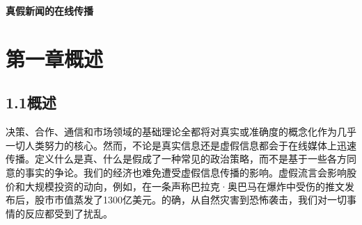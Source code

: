 \documentclass[a4paper,AutoFakeBold,oneside,12pt]{book}
\begin{document}
\begin{nopagenumber}
\begin{center}
\begin{tabular}{ccc}
	\end{tabular}
\end{center}


\newpage\backmatter
\thispagestyle{empty}



\setcounter{chapter}{0}
\renewcommand{\thefigure}{~外\arabic{chapter}-\arabic{figure}~}
\renewcommand{\theequation}{~外\arabic{chapter}-\arabic{equation}~}
\renewcommand{\thetable}{~外\arabic{chapter}-\arabic{table}~}
\renewcommand{\thelstlisting}{~外\arabic{chapter}-\arabic{lstlisting}~}

\begin{center}
\end{center}
\vspace{8mm}
\thispagestyle{empty}


\begin{center}
\sanhao\heiti\textbf{真假新闻的在线传播}

\xiaosihao{}

\xiaosihao{}
\end{center}

\songti{}
\begingroup %
\let\clearpage\relax
\let\cleardoublepage\relax


\chapter*{第一章\quad{}概述}
\newtranschapter

\section*{1.1\quad{}概述}
决策、合作、通信和市场领域的基础理论全都将对真实或准确度的概念化作为几乎一切人类努力的核心。然而，不论是真实信息还是虚假信息都会于在线媒体上迅速传播。定义什么是真、什么是假成了一种常见的政治策略，而不是基于一些各方同意的事实的争论。我们的经济也难免遭受虚假信息传播的影响。虚假流言会影响股价和大规模投资的动向，例如，在一条声称巴拉克·奥巴马在爆炸中受伤的推文发布后，股市市值蒸发了1300亿美元。的确，从自然灾害到恐怖袭击，我们对一切事情的反应都受到了扰乱。


\end{nopagenumber}
\end{document}
